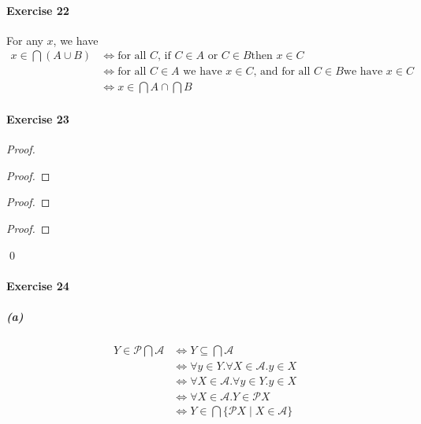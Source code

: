 \documentclass{report}
\begin{document}
    \paragraph{Exercise 22}
    For any $x$, we have
    \begin{align*}
        x \in \bigcap (A \cup B) & \Leftrightarrow \text{for all $C$, if $C \in A$ or $C \in B$
        then $x \in C$} \\
        & \Leftrightarrow \text{for all $C \in A$ we have $x \in C$, and for all $C \in B$
        we have $x \in C$} \\
        & \Leftrightarrow x\in \bigcap A \cap \bigcap B
    \end{align*}

    \paragraph{Exercise 23}
    \begin{proof}
        \pf
        \begin{proof}
        \end{proof}
        \begin{proof}
        \end{proof}
        \begin{proof}
        \end{proof}
        \qed
    \end{proof}

    \paragraph{Exercise 24}
    \subparagraph{(a)}
    \begin{align*}
        Y \in \mathcal{P} \bigcap \mathcal{A}
        & \Leftrightarrow Y \subseteq \bigcap \mathcal{A} \\
        & \Leftrightarrow \forall y \in Y. \forall X \in \mathcal{A}. y \in X \\
        & \Leftrightarrow \forall X \in \mathcal{A}. \forall y \in Y. y \in X \\
        & \Leftrightarrow \forall X \in \mathcal{A}. Y \in \mathcal{P} X \\
        & \Leftrightarrow Y \in \bigcap \{ \mathcal{P} X \mid X \in \mathcal{A} \}
    \end{align*}
\end{document}
